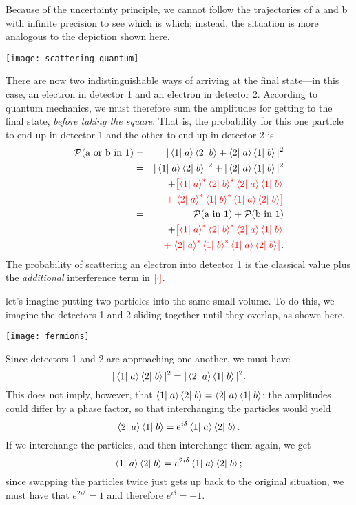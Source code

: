 \begin{sidebar}
Because of the uncertainty principle, we cannot follow the trajectories of a and b with infinite precision to see which is which; instead, the situation is more analogous to the depiction shown here.
\begin{center}
\texttt{[image: scattering-quantum]}
\end{center}
There are now two indistinguishable ways of arriving at the final state---in this case, an electron in detector 1 and an electron in detector 2. According to quantum mechanics, we must therefore sum the amplitudes for getting to the final state, \emph{before taking the square}. That is, the probability for this one particle to end up in detector 1 and the other to end up in detector 2 is
\begin{eqnarray}
    \mathcal{P}(\textrm{a or b in 1}) &=& |\left\langle1\right|\left.a\right\rangle\left\langle2\right|\left.b\right\rangle + \left\langle2\right|\left.a\right\rangle\left\langle1\right|\left.b\right\rangle|^2\nonumber\\
    &=& |\left\langle1\right|\left.a\right\rangle\left\langle2\right|\left.b\right\rangle|^2 + |\left\langle2\right|\left.a\right\rangle\left\langle1\right|\left.b\right\rangle|^2 \nonumber\\
    && + {\color{red}\left[ \left\langle1\right|\left.a\right\rangle^*\left\langle2\right|\left.b\right\rangle^*\left\langle2\right|\left.a\right\rangle\left\langle1\right|\left.b\right\rangle\right.} \nonumber\\
    && {\color{red}+ \left.\left\langle2\right|\left.a\right\rangle^*\left\langle1\right|\left.b\right\rangle^*\left\langle1\right|\left.a\right\rangle\left\langle2\right|\left.b\right\rangle\right]} \nonumber\\
    &=& \mathcal{P}(\textrm{a in 1}) + \mathcal{P}(\textrm{b in 1}) \nonumber\\
    && + {\color{red}\left[ \left\langle1\right|\left.a\right\rangle^*\left\langle2\right|\left.b\right\rangle^*\left\langle2\right|\left.a\right\rangle\left\langle1\right|\left.b\right\rangle\right.}\nonumber\\
    && {\color{red}+ \left.\left\langle2\right|\left.a\right\rangle^*\left\langle1\right|\left.b\right\rangle^*\left\langle1\right|\left.a\right\rangle\left\langle2\right|\left.b\right\rangle\right]}.
    \label{e.scattering-quantum}
\end{eqnarray}
The probability of scattering an electron into detector 1 is the classical value plus the \emph{additional} interference term in $\color{red}[\cdot]$.

 let's imagine putting two particles into the same small volume.  To do this, we imagine the detectors 1 and 2 sliding together until they overlap, as shown here.  
\begin{center}
\texttt{[image: fermions]}
\end{center}
Since detectors 1 and 2 are approaching one another, we must have
\begin{equation}
    |\left\langle1\right|\left.a\right\rangle\left\langle2\right|\left.b\right\rangle|^2 = |\left\langle2\right|\left.a\right\rangle\left\langle1\right|\left.b\right\rangle|^2.
\end{equation}
This does not imply, however, that $\left\langle1\right|\left.a\right\rangle\left\langle2\right|\left.b\right\rangle = \left\langle2\right|\left.a\right\rangle\left\langle1\right|\left.b\right\rangle$: the amplitudes could differ by a phase factor, so that interchanging the particles would yield
\[
    \left\langle2\right|\left.a\right\rangle\left\langle1\right|\left.b\right\rangle = e^{i\delta}\left\langle1\right|\left.a\right\rangle\left\langle2\right|\left.b\right\rangle.
\]
If we interchange the particles, and then interchange them again, we get
\[
    \left\langle1\right|\left.a\right\rangle\left\langle2\right|\left.b\right\rangle = e^{2i\delta}\left\langle1\right|\left.a\right\rangle\left\langle2\right|\left.b\right\rangle;
\]
since swapping the particles twice just gets up back to the original situation, we must have that $e^{2i\delta} = 1$ and therefore $e^{i\delta} = \pm 1$.


\end{sidebar}
